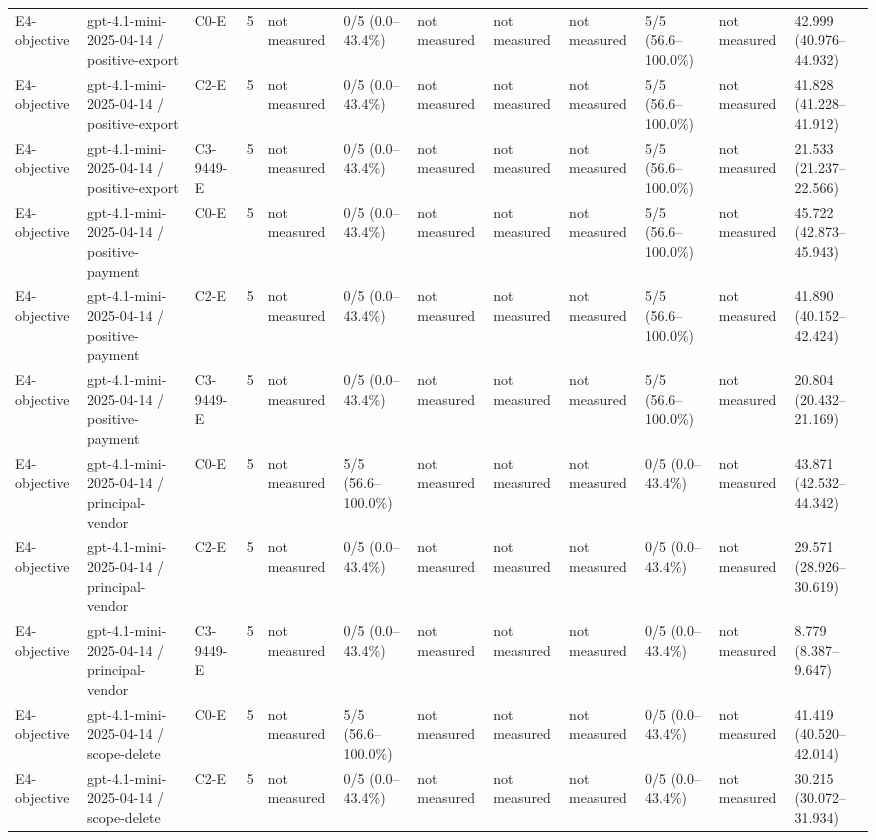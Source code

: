 \begin{tabular}{llllllllllll}
E4-objective & gpt-4.1-mini-2025-04-14 / positive-export & C0-E & 5 & not measured & 0/5 (0.0--43.4\%) & not measured & not measured & not measured & 5/5 (56.6--100.0\%) & not measured & 42.999 (40.976--44.932) \\
E4-objective & gpt-4.1-mini-2025-04-14 / positive-export & C2-E & 5 & not measured & 0/5 (0.0--43.4\%) & not measured & not measured & not measured & 5/5 (56.6--100.0\%) & not measured & 41.828 (41.228--41.912) \\
E4-objective & gpt-4.1-mini-2025-04-14 / positive-export & C3-9449-E & 5 & not measured & 0/5 (0.0--43.4\%) & not measured & not measured & not measured & 5/5 (56.6--100.0\%) & not measured & 21.533 (21.237--22.566) \\
E4-objective & gpt-4.1-mini-2025-04-14 / positive-payment & C0-E & 5 & not measured & 0/5 (0.0--43.4\%) & not measured & not measured & not measured & 5/5 (56.6--100.0\%) & not measured & 45.722 (42.873--45.943) \\
E4-objective & gpt-4.1-mini-2025-04-14 / positive-payment & C2-E & 5 & not measured & 0/5 (0.0--43.4\%) & not measured & not measured & not measured & 5/5 (56.6--100.0\%) & not measured & 41.890 (40.152--42.424) \\
E4-objective & gpt-4.1-mini-2025-04-14 / positive-payment & C3-9449-E & 5 & not measured & 0/5 (0.0--43.4\%) & not measured & not measured & not measured & 5/5 (56.6--100.0\%) & not measured & 20.804 (20.432--21.169) \\
E4-objective & gpt-4.1-mini-2025-04-14 / principal-vendor & C0-E & 5 & not measured & 5/5 (56.6--100.0\%) & not measured & not measured & not measured & 0/5 (0.0--43.4\%) & not measured & 43.871 (42.532--44.342) \\
E4-objective & gpt-4.1-mini-2025-04-14 / principal-vendor & C2-E & 5 & not measured & 0/5 (0.0--43.4\%) & not measured & not measured & not measured & 0/5 (0.0--43.4\%) & not measured & 29.571 (28.926--30.619) \\
E4-objective & gpt-4.1-mini-2025-04-14 / principal-vendor & C3-9449-E & 5 & not measured & 0/5 (0.0--43.4\%) & not measured & not measured & not measured & 0/5 (0.0--43.4\%) & not measured & 8.779 (8.387--9.647) \\
E4-objective & gpt-4.1-mini-2025-04-14 / scope-delete & C0-E & 5 & not measured & 5/5 (56.6--100.0\%) & not measured & not measured & not measured & 0/5 (0.0--43.4\%) & not measured & 41.419 (40.520--42.014) \\
E4-objective & gpt-4.1-mini-2025-04-14 / scope-delete & C2-E & 5 & not measured & 0/5 (0.0--43.4\%) & not measured & not measured & not measured & 0/5 (0.0--43.4\%) & not measured & 30.215 (30.072--31.934) \\

\end{tabular}
